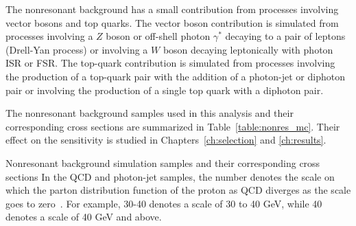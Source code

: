 The nonresonant background has a small contribution from processes involving
vector bosons and top quarks. The vector boson contribution is simulated from processes
involving a $Z$ boson or off-shell photon $\gamma^*$ decaying to a pair of leptons (Drell-Yan process)
or involving a $W$ boson decaying leptonically with photon ISR or FSR. The top-quark contribution is
simulated from processes involving the production of a top-quark pair with the addition of a
photon-jet or diphoton pair or involving the production of a single top quark with a diphoton pair.

The nonresonant background samples used in this analysis and their corresponding 
cross sections are summarized in Table~\ref{table:nonres_mc}.
Their effect on the sensitivity is studied in Chapters~\ref{ch:selection} and \ref{ch:results}.

\begin{table}[htbp!]
  \centering
  \renewcommand{\arraystretch}{1.4}
  \caption{Nonresonant background simulation samples and their corresponding cross sections
In the QCD and photon-jet samples, the number denotes the scale on which the parton
distribution function of the proton as QCD diverges as the scale goes to zero~\cite{Martin:2009iq}.
For example, 30-40 denotes a scale of 30 to 40 GeV, while 40 denotes a scale of 40 GeV and above.}
  
  \label{table:nonres_mc}
\end{table}
